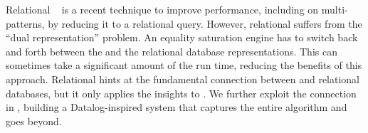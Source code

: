 Relational \ematching~\citep{relational-ematching} 
 is a recent technique to improve \ematching performance, 
 including on multi-patterns,
 by reducing it to a relational query.
However, relational \ematching suffers from the ``dual representation'' problem.
An equality saturation engine has to 
 switch back and forth between the \egraphs and 
 the relational database representations.
This can sometimes take a significant amount of the run time,
 reducing the benefits of this approach.
Relational \ematching hints 
 at the fundamental connection between \egraphs and relational databases,
 but it only applies the insights to \ematching.
We further exploit the connection in \egglog,
 building a Datalog-inspired system that
 captures the entire \eqsat algorithm and goes beyond.

